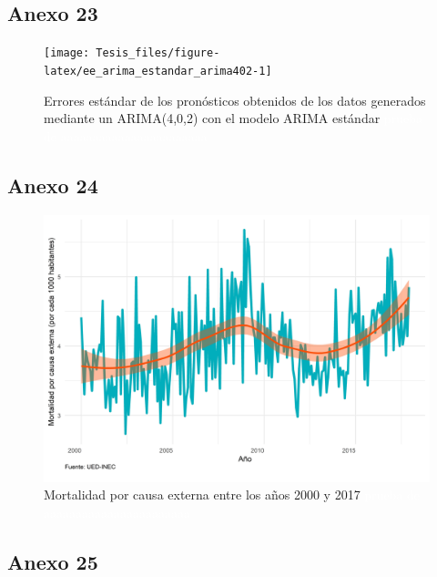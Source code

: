 \documentclass[
]{article}
\begin{document}
\subsection{Anexo 23}

\begin{figure}[H]
\texttt{[image: Tesis\_files/figure-latex/ee\_arima\_estandar\_arima402-1]} \caption{Errores estándar de los pronósticos obtenidos de los datos generados mediante un ARIMA(4,0,2) con el modelo ARIMA estándar \textcolor{white}{prueba de aaaaaaaaaaaaaaaaaaaaaaa}}\label{fig:ee_arima_estandar_arima402}
\end{figure}

\subsection{Anexo 24}

\begin{figure}[H]
\includegraphics[width=1\linewidth,height=1\textheight]{Tesis_files/figure-latex/externaplotgeneral-1} \caption{Mortalidad por causa externa entre los años 2000 y 2017 \textcolor{white}{prueba de aaaaaaaaaaaaaaaaaaaaaaa}}\label{fig:externaplotgeneral}
\end{figure}

\subsection{Anexo 25}
\end{document}
